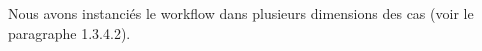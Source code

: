 Nous avons instanciés le workflow dans plusieurs dimensions des cas (voir le paragraphe 1.3.4.2).         
 
